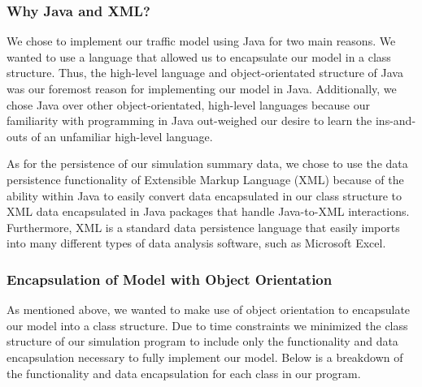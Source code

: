 \documentclass{amsart}
\begin{document}
		\subsubsection{Why Java and XML?}
			
			We chose to implement our traffic model using Java for two main reasons. We wanted to use a language that allowed us to encapsulate our model in a class structure. Thus, the high-level language and object-orientated structure of Java was our foremost reason for implementing our model in Java. Additionally, we chose Java over other object-orientated, high-level languages because our familiarity with programming in Java out-weighed our desire to learn the ins-and-outs of an unfamiliar high-level language.
			
			As for the persistence of our simulation summary data, we chose to use the data persistence functionality of Extensible Markup Language (XML) because of the ability within Java to easily convert data encapsulated in our class structure to XML data encapsulated in Java packages that handle Java-to-XML interactions. Furthermore, XML is a standard data persistence language that easily imports into many different types of data analysis software, such as Microsoft Excel. 
			
		\subsubsection{Encapsulation of Model with Object Orientation}
		
		As mentioned above, we wanted to make use of object orientation to encapsulate our model into a class structure. Due to time constraints we minimized the class structure of our simulation program to include only the functionality and data encapsulation necessary to fully implement our model. Below is a breakdown of the functionality and data encapsulation for each class in our program.
		
\end{document}
